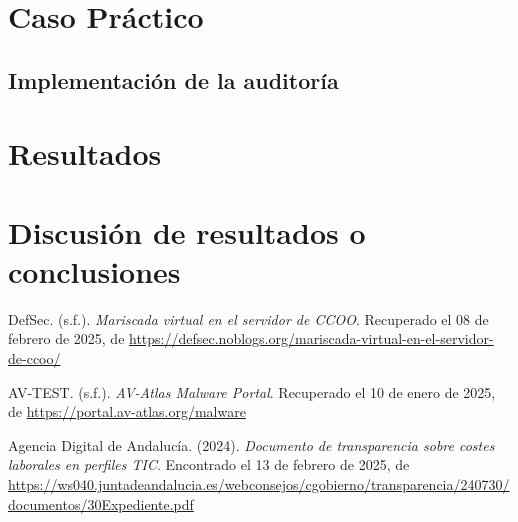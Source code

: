 \documentclass[a4paper, 10pt]{article}
\begin{document}
\clearpage


\section{Caso Práctico}

\subsection{Implementación de la auditoría}


\clearpage

\section{Resultados}



\clearpage

\section{Discusión de resultados o conclusiones}



\clearpage

\begin{thebibliography}{20}
    
    DefSec. (s.f.). \textit{Mariscada virtual en el servidor de CCOO}. Recuperado el 08 de febrero de 2025, de \url{https://defsec.noblogs.org/mariscada-virtual-en-el-servidor-de-ccoo/}
    
    AV-TEST. (s.f.). \textit{AV-Atlas Malware Portal}. Recuperado el 10 de enero de 2025, de \url{https://portal.av-atlas.org/malware}
    
    Agencia Digital de Andalucía. (2024). \textit{Documento de transparencia sobre costes laborales en perfiles TIC}. Encontrado el 13 de febrero de 2025, de \url{https://ws040.juntadeandalucia.es/webconsejos/cgobierno/transparencia/240730/documentos/30Expediente.pdf}
    

\end{thebibliography}


\clearpage
\end{document}
